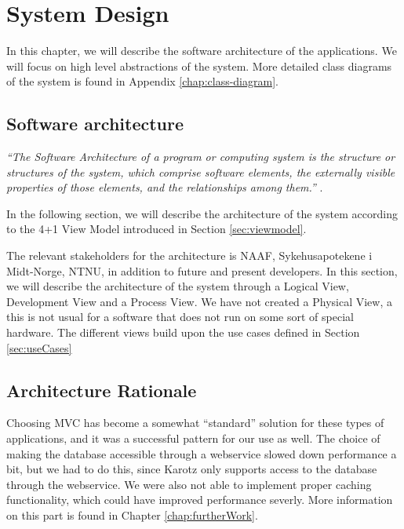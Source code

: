\chapter{System Design}
\label{chap:systemDesign}
In this chapter, we will describe the software architecture of the applications.
We will focus on high level abstractions of the system. More detailed class diagrams of the system
is found in Appendix \ref{chap:class-diagram}.



\section{Software architecture}
\emph{``The Software Architecture of a program or computing system is the structure or structures of the system, which comprise
software elements, the externally visible properties of those elements, and the relationships among them.''} \cite{bassclemetskazman}.
 
In the following section, we will describe the architecture of the system according to the 4+1 View Model 
introduced in Section \ref{sec:viewmodel}.


The relevant stakeholders for the architecture is NAAF, Sykehusapotekene
i Midt-Norge, NTNU, in addition to future and present developers. In this section, we will
describe the architecture of the system through a Logical View, Development
View and a Process View. We have not created a Physical View, a this is not usual for a software that does not run on some sort of special hardware. 
The different views build upon the use cases defined in Section \ref{sec:useCases}






\clearpage{}
\section{Architecture Rationale}

Choosing MVC has become a somewhat ``standard'' solution for these types of applications, and it was a successful pattern for our use as well.   
The choice of making the database accessible through a webservice slowed down performance a bit, but we had to do this, since Karotz only
supports access to the database through the webservice. 
We were also not able to implement proper caching functionality, which could have improved performance severly. More information on this part
is found in Chapter \ref{chap:furtherWork}. 

